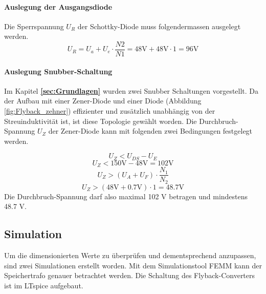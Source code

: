 \paragraph{Auslegung der Ausgangsdiode}
Die Sperrspannung $ U_{R} $ der Schottky-Diode muss folgendermassen ausgelegt werden.
\begin{equation}\label{eq:sperrspannung_diode}
U_{R} = U_{a} + U_{e} \cdot \frac{N2}{N1} = 48\mathrm{V} + 48\mathrm{V} \cdot 1 = 96\mathrm{V}
\end{equation}

\paragraph{Auslegung  Snubber-Schaltung}
Im Kapitel \textbf{\ref{sec:Grundlagen} } wurden zwei Snubber Schaltungen vorgestellt. Da der Aufbau mit einer Zener-Diode und einer Diode (Abbildung \ref{fig:Flyback_zehner}) effizienter und zusätzlich unabhängig von der Streuinduktivität ist, ist diese Topologie gewählt worden. Die Durchbruch-Spannung $ U_{Z} $ der Zener-Diode kann mit folgenden zwei Bedingungen festgelegt werden.  

\begin{equation}\label{eq:sperrspannung_zener1}
U_{Z} < U_{DS} - U_{E}
\end{equation}
\begin{equation}\label{eq:sperrspannung_zener1_berechnet}
U_{Z} <  150\mathrm{V} - 48\mathrm{V}  = 102\mathrm{V}
\end{equation}
\begin{equation}\label{eq:sperrspannung_zehner2}
U_{Z} > (U_{A} + U_{F}) \cdot \frac{N_{1}}{N_{2}}
\end{equation}
\begin{equation}\label{eq:sperrspannung_zehner2_berechnet}
U_{Z} >(48\mathrm{V} + 0.7\mathrm{V}) \cdot 1 = 48.7\mathrm{V}
\end{equation}
Die Durchbruch-Spannung darf also maximal 102 V betragen und mindestens 48.7 V.

\subsection{Simulation}\label{sec:simulation}
Um die dimensionierten Werte zu überprüfen und dementsprechend anzupassen, sind zwei Simulationen erstellt worden. Mit dem Simulationstool FEMM kann der Speichertrafo genauer betrachtet werden. Die Schaltung des Flyback-Converters ist im LTspice aufgebaut.

